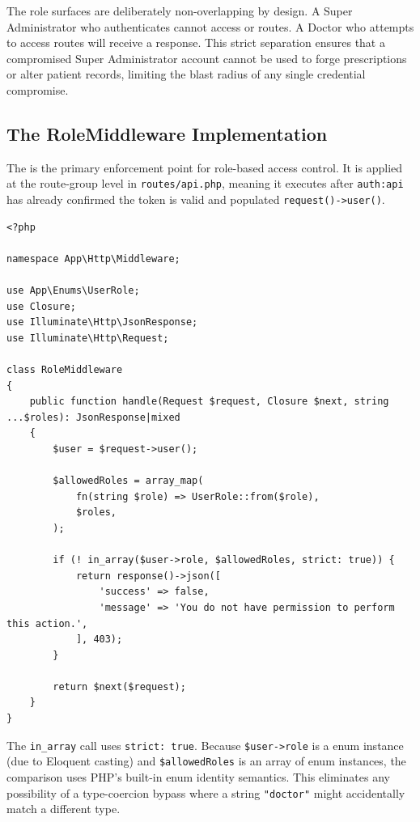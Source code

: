 \begin{importantbox}
  The role surfaces are deliberately non-overlapping by design. A Super
  Administrator who authenticates cannot access
   or
   routes. A Doctor who attempts
  to access  routes will receive a
  \stforbid{} response. This strict separation ensures that a
  compromised Super Administrator account cannot be used to forge
  prescriptions or alter patient records, limiting the blast radius of
  any single credential compromise.
\end{importantbox}

\subsection{The RoleMiddleware Implementation}

The  is the primary enforcement point for
role-based access control. It is applied at the route-group level in
\texttt{routes/api.php}, meaning it executes after \texttt{auth:api}
has already confirmed the token is valid and populated
\texttt{request()->user()}.

\begin{lstlisting}[style=php, caption={\texttt{app/Http/Middleware/RoleMiddleware.php}
  --- Strict role gate using the UserRole enum.}]
<?php

namespace App\Http\Middleware;

use App\Enums\UserRole;
use Closure;
use Illuminate\Http\JsonResponse;
use Illuminate\Http\Request;

class RoleMiddleware
{
    public function handle(Request $request, Closure $next, string ...$roles): JsonResponse|mixed
    {
        $user = $request->user();

        $allowedRoles = array_map(
            fn(string $role) => UserRole::from($role),
            $roles,
        );

        if (! in_array($user->role, $allowedRoles, strict: true)) {
            return response()->json([
                'success' => false,
                'message' => 'You do not have permission to perform this action.',
            ], 403);
        }

        return $next($request);
    }
}
\end{lstlisting}

\begin{notebox}
  The \texttt{in\_array} call uses \texttt{strict: true}. Because
  \texttt{\$user->role} is a  enum instance (due to
  Eloquent casting) and \texttt{\$allowedRoles} is an array of
   enum instances, the comparison uses PHP's
  built-in enum identity semantics. This eliminates any possibility of
  a type-coercion bypass where a string \texttt{"doctor"} might
  accidentally match a different type.
\end{notebox}

